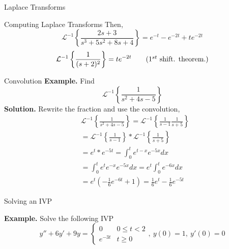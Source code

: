 \documentclass{article}
\newcommand{\ilaplace}[1]{\mathcal{L}^{-1}\left\{#1\right\}}
\begin{document}
\begin{multicols*}{3}
\begin{blackbox}{Laplace Transforms}
\begin{bluebox}{Computing Laplace Transforms}
{                Then, \\[-3ex]
                \[
                    \ilaplace{\frac{2s+3}{s^3+5s^2 + 8s+ 4}} =  e^{-t} - e^{-2t} + te^{-2t}
                \]
                \[\ilaplace{\frac{1}{(s+2)^2}} = te^{-2t}\tag{$1^{st}$ shift. theorem.}\]
                }
            \end{bluebox}
            \begin{redbox}{Convolution}
                \textbf{Example.} Find \\[-4ex]
                {\footnotesize
                \[\ilaplace{\frac{1}{s^2 + 4s - 5}}\]
                \textbf{Solution.} Rewrite the fraction and use the convolution, \\[-3ex]
                \begin{align*}
                    &\ilaplace{\frac{1}{s^2 + 4s - 5}} = \ilaplace{\frac{1}{s-1} \frac{1}{s+5}} \\
                    &= \ilaplace{\frac{1}{s-1}} * \ilaplace{\frac{1}{s+5}}\\
                    &= e^{t} * e^{-5t} = \int_0^t e^{t-x}e^{-5x}dx\\
                    &= \int_0^t e^{t}e^{-x}e^{-5x}dx = e^t \int_0^t e^{-6x}dx\\
                    &= e^t\left(-\frac{1}{6}e^{-6t} + 1\right) = \frac{1}{6}e^t - \frac{1}{6}e^{-5t}
                \end{align*}
                }
            \end{redbox}
            \begin{brownbox}{Solving an IVP}
                {\footnotesize
                \textbf{Example.} Solve the following IVP \\[-2ex]
                \[y'' + 6y' + 9y = \begin{cases}
                    0 & 0 \leq t < 2\\
                    e^{-3t} & t \geq 0
                \end{cases}, \ y(0) = 1, \ y'(0) = 0\]
                
}
\end{brownbox}
\end{blackbox}
\end{multicols*}
\end{document}
